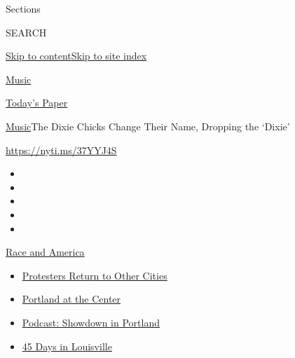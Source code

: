 Sections

SEARCH

\protect\hyperlink{site-content}{Skip to
content}\protect\hyperlink{site-index}{Skip to site index}

\href{https://www.nytimes3xbfgragh.onion/section/arts/music}{Music}

\href{https://myaccount.nytimes3xbfgragh.onion/auth/login?response_type=cookie\&client_id=vi}{}

\href{https://www.nytimes3xbfgragh.onion/section/todayspaper}{Today's
Paper}

\href{/section/arts/music}{Music}\textbar{}The Dixie Chicks Change Their
Name, Dropping the `Dixie'

\url{https://nyti.ms/37YYJ4S}

\begin{itemize}
\item
\item
\item
\item
\item
\end{itemize}

\href{https://www.nytimes3xbfgragh.onion/news-event/george-floyd-protests-minneapolis-new-york-los-angeles?action=click\&pgtype=Article\&state=default\&region=TOP_BANNER\&context=storylines_menu}{Race
and America}

\begin{itemize}
\tightlist
\item
  \href{https://www.nytimes3xbfgragh.onion/2020/07/26/us/protests-portland-seattle-trump.html?action=click\&pgtype=Article\&state=default\&region=TOP_BANNER\&context=storylines_menu}{Protesters
  Return to Other Cities}
\item
  \href{https://www.nytimes3xbfgragh.onion/2020/07/24/us/portland-oregon-protests-white-race.html?action=click\&pgtype=Article\&state=default\&region=TOP_BANNER\&context=storylines_menu}{Portland
  at the Center}
\item
  \href{https://www.nytimes3xbfgragh.onion/2020/07/23/podcasts/the-daily/portland-protests.html?action=click\&pgtype=Article\&state=default\&region=TOP_BANNER\&context=storylines_menu}{Podcast:
  Showdown in Portland}
\item
  \href{https://www.nytimes3xbfgragh.onion/interactive/2020/07/16/us/black-lives-matter-protests-louisville-breonna-taylor.html?action=click\&pgtype=Article\&state=default\&region=TOP_BANNER\&context=storylines_menu}{45
  Days in Louisville}
\end{itemize}


